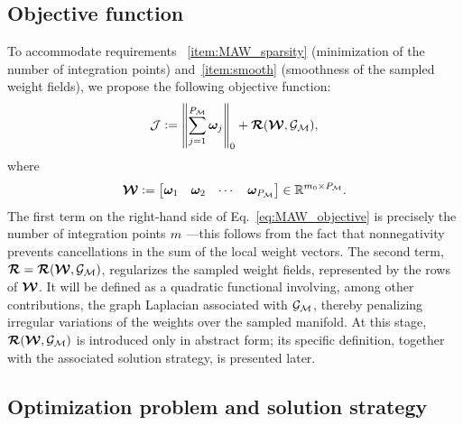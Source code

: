 \documentclass[preprint,10pt]{elsarticle}  %
\newcommand{\PROMPT}[1]{ }
\begin{document}
%
%
% 
%
%


\subsection{Objective function}
\label{sec:formulationGENERAL}

%

To accommodate    requirements ~\ref{item:MAW_sparsity} (minimization of the number of integration points) and~\ref{item:smooth}  (smoothness of the sampled
weight fields), we propose the following objective function:
\begin{equation}
\label{eq:MAW_objective}
\mathcal{J}
\mathrel{\mathop:}=
\left\|
\sum_{j=1}^{P_{\mathcal{M}}}
\bm{\omega}_{j}
\right\|_0
+
 \boldsymbol{\mathcal{R}}(\boldsymbol{\mathcal{W}},\mathcal{G}_{\mathcal{M}}),
\end{equation}
where
\begin{equation}
\label{eq:adaptive_weight_matrix}
\boldsymbol{\mathcal{W}}
\mathrel{\mathop:}=
\begin{bmatrix}
\bm{\omega}_{1} &
\bm{\omega}_{2} &
\cdots &
\bm{\omega}_{P_{\mathcal{M}}}
\end{bmatrix}
\in
\mathbb{R}^{m_0\times P_{\mathcal{M}}}.
\end{equation}
The first term on the right-hand side of
Eq.~\eqref{eq:MAW_objective} is precisely the number of integration
points $m$ ---this follows from the fact that   nonnegativity prevents cancellations in the sum of the local
weight vectors.  The second term,
\(\boldsymbol{\mathcal{R}}=\boldsymbol{\mathcal{R}}(\boldsymbol{\mathcal{W}},\mathcal{G}_{\mathcal{M}})\), regularizes the sampled weight fields,
represented by the rows of \(\boldsymbol{\mathcal{W}}\). It will be defined as a quadratic
functional involving, among other contributions, the graph Laplacian
associated with \(\mathcal{G}_{\mathcal{M}}\), thereby penalizing irregular variations of
the weights over the sampled manifold. At this stage,
\(\boldsymbol{\mathcal{R}}(\boldsymbol{\mathcal{W}},\mathcal{G}_{\mathcal{M}})\) is introduced only in abstract form; its specific
definition, together with the associated solution strategy, is
presented later.

\subsection{Optimization problem and solution strategy}
\label{sec:MAW_solution_strategy}
\end{document}
